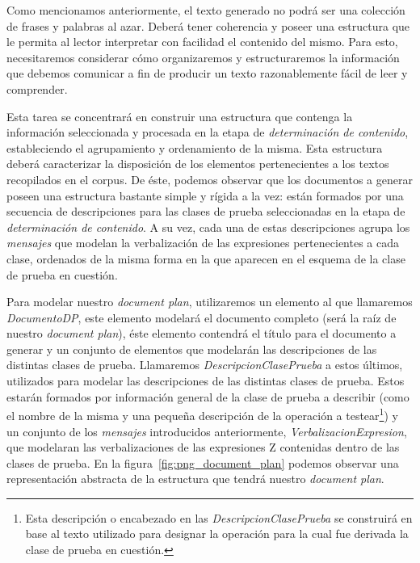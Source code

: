 Como mencionamos anteriormente, el texto generado no podrá ser una colección de frases y palabras al azar. Deberá tener coherencia y poseer una estructura que le permita al lector interpretar con facilidad el contenido del mismo. Para esto, necesitaremos considerar cómo organizaremos y estructuraremos la información que debemos comunicar a fin de producir un texto razonablemente fácil de leer y comprender.

Esta tarea se concentrará en construir una estructura que contenga la información seleccionada y procesada en la etapa de \emph{determinación de contenido}, estableciendo el agrupamiento y ordenamiento de la misma. Esta estructura deberá caracterizar la disposición de los elementos pertenecientes a los textos recopilados en el corpus. De éste, podemos observar que los documentos a generar poseen una estructura bastante simple y rígida a la vez: están formados por una secuencia de descripciones para las clases de prueba seleccionadas en la etapa de \emph{determinación de contenido}. A su vez, cada una de estas descripciones agrupa los \emph{mensajes} que modelan la verbalización de las expresiones pertenecientes a cada clase, ordenados de la misma forma en la que aparecen en el esquema de la clase de prueba en cuestión. 

Para modelar nuestro \emph{document plan}, utilizaremos un elemento al que llamaremos \emph{DocumentoDP}, este elemento modelará el documento completo (será la raíz de nuestro \emph{document plan}), éste elemento contendrá el título para el documento a generar y un conjunto de elementos que modelarán las descripciones de las distintas clases de prueba. Llamaremos \emph{DescripcionClasePrueba} a estos últimos, utilizados para modelar las descripciones de las distintas clases de prueba. Estos estarán formados por información general de la clase de prueba a describir (como el nombre de la misma y una pequeña descripción de la operación a testear\footnote{Esta descripción o encabezado en las \emph{DescripcionClasePrueba} se construirá en base al texto utilizado para designar la operación para la cual fue derivada la clase de prueba en cuestión.}) y un conjunto de los \emph{mensajes} introducidos anteriormente, \emph{VerbalizacionExpresion}, que modelaran las verbalizaciones de las expresiones Z contenidas dentro de las clases de prueba. En la figura~\ref{fig:png_document_plan} podemos observar una representación abstracta de la estructura que tendrá nuestro \emph{document plan}.

